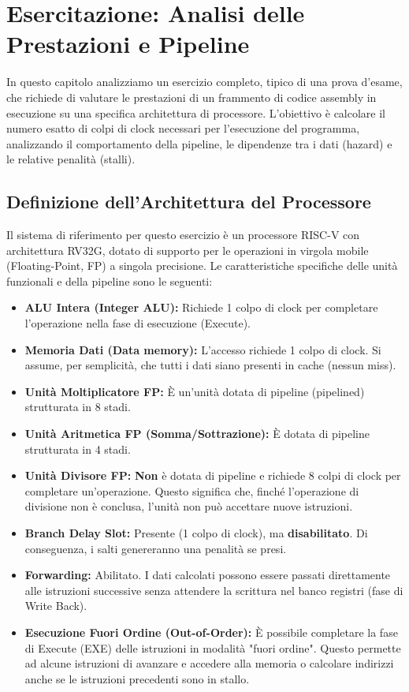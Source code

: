\chapter{Esercitazione: Analisi delle Prestazioni e Pipeline}

In questo capitolo analizziamo un esercizio completo, tipico di una prova d'esame, che richiede di valutare le prestazioni di un frammento di codice assembly in esecuzione su una specifica architettura di processore. L'obiettivo è calcolare il numero esatto di colpi di clock necessari per l'esecuzione del programma, analizzando il comportamento della pipeline, le dipendenze tra i dati (hazard) e le relative penalità (stalli).

\section{Definizione dell'Architettura del Processore}

Il sistema di riferimento per questo esercizio è un processore RISC-V con architettura RV32G, dotato di supporto per le operazioni in virgola mobile (Floating-Point, FP) a singola precisione. Le caratteristiche specifiche delle unità funzionali e della pipeline sono le seguenti:

\begin{itemize}
    \item \textbf{ALU Intera (Integer ALU):} Richiede 1 colpo di clock per completare l'operazione nella fase di esecuzione (Execute).
    \item \textbf{Memoria Dati (Data memory):} L'accesso richiede 1 colpo di clock. Si assume, per semplicità, che tutti i dati siano presenti in cache (nessun miss).
    \item \textbf{Unità Moltiplicatore FP:} È un'unità dotata di pipeline (pipelined) strutturata in 8 stadi.
    \item \textbf{Unità Aritmetica FP (Somma/Sottrazione):} È dotata di pipeline strutturata in 4 stadi.
    \item \textbf{Unità Divisore FP:} \textbf{Non} è dotata di pipeline e richiede 8 colpi di clock per completare un'operazione. Questo significa che, finché l'operazione di divisione non è conclusa, l'unità non può accettare nuove istruzioni.
    \item \textbf{Branch Delay Slot:} Presente (1 colpo di clock), ma \textbf{disabilitato}. Di conseguenza, i salti genereranno una penalità se presi.
    \item \textbf{Forwarding:} Abilitato. I dati calcolati possono essere passati direttamente alle istruzioni successive senza attendere la scrittura nel banco registri (fase di Write Back).
    \item \textbf{Esecuzione Fuori Ordine (Out-of-Order):} È possibile completare la fase di Execute (EXE) delle istruzioni in modalità "fuori ordine". Questo permette ad alcune istruzioni di avanzare e accedere alla memoria o calcolare indirizzi anche se le istruzioni precedenti sono in stallo.
\end{itemize}

